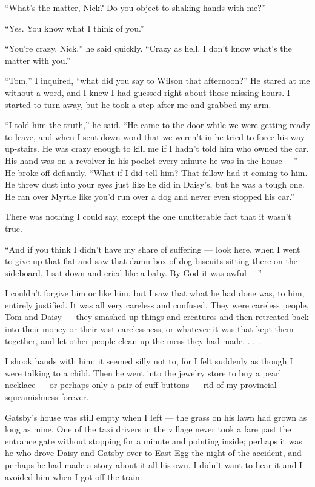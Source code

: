\documentclass{znotebook}
\begin{document}
``What's the matter, Nick? Do you object to shaking hands with me?''

``Yes. You know what I think of you.''

``You're crazy, Nick,'' he said quickly. ``Crazy as hell. I don't know what's the matter with you.''

``Tom,'' I inquired, ``what did you say to Wilson that afternoon?'' He stared at me without a word, and I knew I had guessed right about those missing hours. I started to turn away, but he took a step after me and grabbed my arm.

``I told him the truth,'' he said. ``He came to the door while we were getting ready to leave, and when I sent down word that we weren't in he tried to force his way up-stairs. He was crazy enough to kill me if I hadn't told him who owned the car. His hand was on a revolver in his pocket every minute he was in the house ---'' He broke off defiantly. ``What if I did tell him? That fellow had it coming to him. He threw dust into your eyes just like he did in Daisy's, but he was a tough one. He ran over Myrtle like you'd run over a dog and never even stopped his car.''

There was nothing I could say, except the one unutterable fact that it wasn't true.

``And if you think I didn't have my share of suffering ---{} look here, when I went to give up that flat and saw that damn box of dog biscuits sitting there on the sideboard, I sat down and cried like a baby. By God it was awful ---''

I couldn't forgive him or like him, but I saw that what he had done was, to him, entirely justified. It was all very careless and confused. They were careless people, Tom and Daisy ---{} they smashed up things and creatures and then retreated back into their money or their vast carelessness, or whatever it was that kept them together, and let other people clean up the mess they had made. . . .

I shook hands with him; it seemed silly not to, for I felt suddenly as though I were talking to a child. Then he went into the jewelry store to buy a pearl necklace ---{} or perhaps only a pair of cuff buttons ---{} rid of my provincial squeamishness forever.

Gatsby's house was still empty when I left ---{} the grass on his lawn had grown as long as mine. One of the taxi drivers in the village never took a fare past the entrance gate without stopping for a minute and pointing inside; perhaps it was he who drove Daisy and Gatsby over to East Egg the night of the accident, and perhaps he had made a story about it all his own. I didn't want to hear it and I avoided him when I got off the train.
\end{document}
